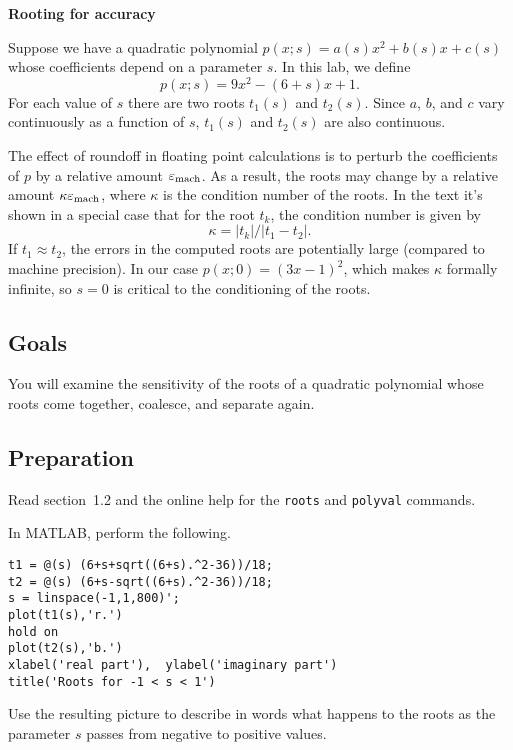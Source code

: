 \documentclass[11pt]{article}
\begin{document}
\begin{center}
  \bf Rooting for accuracy
\end{center}

Suppose we have a quadratic polynomial $p(x;s) = a(s)x^2+b(s)x+c(s)$ whose coefficients depend on a parameter $s$. In this lab, we define
\begin{equation}
  \label{eq:poly}
  p(x;s) = 9x^2 - (6+s)x + 1.
\end{equation}
For each value of $s$ there are two roots $t_1(s)$ and $t_2(s)$. Since $a$, $b$, and $c$ vary continuously as a function of $s$, $t_1(s)$ and $t_2(s)$ are also continuous.

The effect of roundoff in floating point calculations is to perturb the coefficients of $p$ by a relative amount $\varepsilon_{\text{mach}}$. As a result, the roots may change by a relative amount $\kappa \varepsilon_{\text{mach}}$, where $\kappa$ is the condition number of the roots. In the text it's shown in a special case that for the root $t_k$, the condition number is given by
\begin{equation}
  \label{eq:kappa}
  \kappa = |t_k|/|t_1-t_2|.
\end{equation}
If $t_1\approx t_2$, the errors in the computed roots are potentially large (compared to machine precision). In our case $p(x;0)=(3x-1)^2$, which makes $\kappa$ formally infinite, so $s=0$ is critical to the conditioning of the roots.



\subsection*{Goals}

You will examine the sensitivity of the roots of a quadratic polynomial whose roots come together, coalesce, and separate again.

\subsection*{Preparation}

Read section~1.2 and the online help for the \texttt{roots} and \texttt{polyval} commands.

In MATLAB, perform the following.
\begin{verbatim}
t1 = @(s) (6+s+sqrt((6+s).^2-36))/18;
t2 = @(s) (6+s-sqrt((6+s).^2-36))/18;
s = linspace(-1,1,800)';
plot(t1(s),'r.')
hold on
plot(t2(s),'b.')
xlabel('real part'),  ylabel('imaginary part')
title('Roots for -1 < s < 1') 
\end{verbatim}
Use the resulting picture to describe in words what happens to the roots as the parameter $s$ passes from negative to positive values. 
\end{document}
